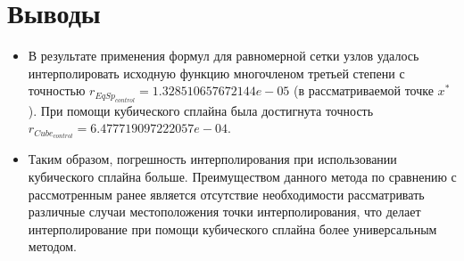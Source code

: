 \documentclass[14pt, a4paper]{article}
\begin{document}
  \section{Выводы}
  \begin{itemize}
  \item
  В результате применения формул для равномерной сетки узлов удалось интерполировать исходную функцию многочленом третьей степени с точностью $r_{EqSp_{control}} = 1.328510657672144e-05$ (в рассматриваемой точке $x^*$). При помощи кубического сплайна была достигнута точность $r_{Cube_{control}} = 6.477719097222057e-04$.
  \item
  Таким образом, погрешность интерполирования при использовании кубического сплайна больше. Преимуществом данного метода по сравнению с рассмотренным ранее является отсутствие необходимости рассматривать различные случаи местоположения точки интерполирования, что делает интерполирование при помощи кубического сплайна более универсальным методом.
  \end{itemize}
\end{document}
